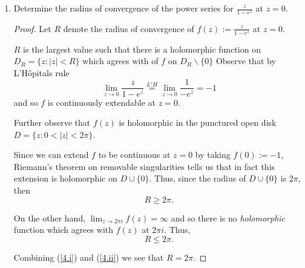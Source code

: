 \documentclass{article}
\begin{document}
\begin{enumerate}
\begin{proof}
		The coefficient of $z^1$ is
		\begin{align*}
			-\frac{1}{2} \left ( \frac{1}{8} + \frac{1}{16} + \frac{1}{32} + \cdots \right ) &= - \frac{1}{2} \left ( 2 - 1 - \frac{1}{2} - \frac{1}{4} \right )\\
			&= - \frac{1}{8}.
		\end{align*}
		 
		Therefore \[ f(z) = \cdots - \frac{1}{2z} - \frac{1}{4} - \frac{z}{8} + \cdots \]
	\end{proof}
	
Note that there is also a Laurent series which converges for the annulus $0 < |z| < 1$. This can be found by using the geometric series expansion \[\frac{1}{z-1} = \frac{-1}{1-z} = - \sum_{n=0}^\infty z^n\] which of course converges for $|z|< 1$, and using the same expansion of $\frac{1}{z-2}$ as above. The expansion which converges on the punctured unit disk is the one provided by SageMath. For another example of this, see \href{https://math.stackexchange.com/questions/2553132/laurent-series-for-different-domains}{this math StackExchange post}.

\setcounter{enumi}{3}

\item Determine the radius of convergence of the power series for $\frac{z}{1-e^z}$ at $z=0$.

\begin{proof}
	Let $R$ denote the radius of convergence of $f(z):= \frac{z}{1-e^z}$ at $z=0$.
	
	$R$ is the largest value such that there is a holomorphic function on $D_R = \{ z : |z| < R\}$ which agrees with of $f$ on $D_R \backslash \{0\}$
	Observe that by L'H\^{o}pitals rule
	\[\lim_{z \rightarrow 0} \frac{z}{1-e^z} \stackrel{L'H}{=} \lim_{z \rightarrow 0} \frac{1}{-e^z} = -1\]
	and so $f$ is continuously extendable at $z=0$. 
	
	Further observe that $f(z)$ is holomorphic in the punctured open disk $D = \{ z : 0< |z| < 2\pi\}$. 
	
	Since we can extend $f$ to be continuous at $z=0$ by taking $f(0):=-1$, Riemann's theorem on removable singularities tells us that in fact this extension is holomorphic on $D \cup \{0\}$. Thus, since the radius of $D\cup\{0\}$ is $2\pi$, then 
	\begin{equation}\label{4.i}R \geq 2\pi .\end{equation}
	
	On the other hand, $\lim_{z \rightarrow 2\pi i} f(z) = \infty$ and so there is no \textit{holomorphic} function which agrees with $f(z)$ at $2\pi i$. Thus, \begin{equation} \label{4.ii} R\leq 2\pi. \end{equation} 
	
	Combining (\ref{4.i}) and (\ref{4.ii}) we see that $R = 2\pi$.
\end{proof}	

\end{enumerate}
\end{document}
